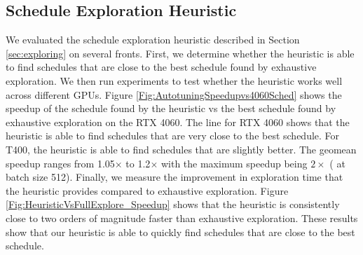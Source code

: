 

\subsection{Schedule Exploration Heuristic}
We evaluated the schedule exploration heuristic described in Section \ref{sec:exploring} on several fronts.
First, we determine whether the heuristic is able to find schedules that are close to the best 
schedule found by exhaustive exploration. We then run experiments to test whether the heuristic works well 
across different GPUs. Figure \ref{Fig:AutotuningSpeedupvs4060Sched} shows the speedup of the schedule 
found by the heuristic vs the best schedule found by exhaustive exploration on the RTX 4060. The line 
for RTX 4060 shows that the heuristic is able to find schedules that are very close to the best schedule.
For T400, the heuristic is able to find schedules that are slightly better. The geomean speedup ranges 
from 1.05$\times$ to 1.2$\times$ with the maximum speedup being $2\times$ ( at batch size 512).
Finally, we measure the improvement in exploration time that the heuristic provides 
compared to exhaustive exploration. Figure \ref{Fig:HeuristicVsFullExplore_Speedup} shows that the heuristic
is consistently close to two orders of magnitude faster than exhaustive exploration. 
These results show that our heuristic is able to quickly find schedules that are close to the best schedule.

